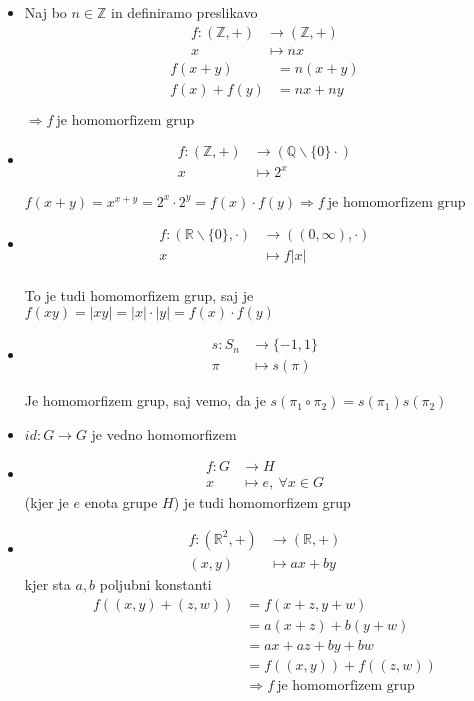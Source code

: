 \documentclass[a4paper,12pt]{article}
\begin{document}
\begin{itemize}

\item Naj bo $n\in \mathbb{Z}$ in definiramo preslikavo 
\begin{align*}
f:(\mathbb{Z},+) & \rightarrow (\mathbb{Z},+)\\
x& \mapsto nx
\end{align*}
\begin{align*}
f(x+y)& =n(x+y)  \\
f(x)+f(y)& =nx+ny 
\end{align*} 
\begin{center}
$\Rightarrow f~\text{je homomorfizem grup}$
\end{center}

\item 
\begin{align*}
f:(\mathbb{Z},+) & \rightarrow (\mathbb{Q}\backslash \{0\}\cdot)\\
x & \mapsto 2^x
\end{align*} 
\begin{center}
$f(x+y)=x^{x+y}=2^x\cdot 2^y=f(x)\cdot f(y) \Rightarrow f~\text{je homomorfizem grup}$
\end{center}

\item 
\begin{align*}
f:(\mathbb{R}\backslash \{0\},\cdot)& \rightarrow((0,\infty),\cdot)\\
x & \mapsto f|x|
\end{align*} \\
To je tudi homomorfizem grup, saj je $f(xy)=|xy|=|x|\cdot |y|=f(x)\cdot f(y)$

\item 
\begin{align*}
s: S_n & \rightarrow \{-1,1\}\\
\pi & \mapsto s(\pi)
\end{align*}

Je homomorfizem grup, saj vemo, da je $s(\pi_1\circ \pi_2)=s(\pi_1)s(\pi_2)$

\item $id:G\rightarrow G$ je vedno homomorfizem
\item 
\begin{align*}
f:G & \rightarrow H \\
x & \mapsto e,~\forall x\in G
\end{align*}
(kjer je $e$ enota grupe $H$) je tudi homomorfizem grup
\item 
\begin{align*}
f:(\mathbb{R}^2,+)&\rightarrow(\mathbb{R},+) \\ 
(x,y) & \mapsto ax+by
\end{align*}
kjer sta $a,b$ poljubni konstanti 
\begin{align*}
f((x,y)+(z,w))& =f(x+z,y+w)\\
& =a(x+z)+b(y+w) \\
& =ax+az+by+bw \\
& =f((x,y))+f((z,w))\\
& \Rightarrow f ~ \text{je homomorfizem grup}\\
\end{align*}


\end{itemize}
\end{document}
